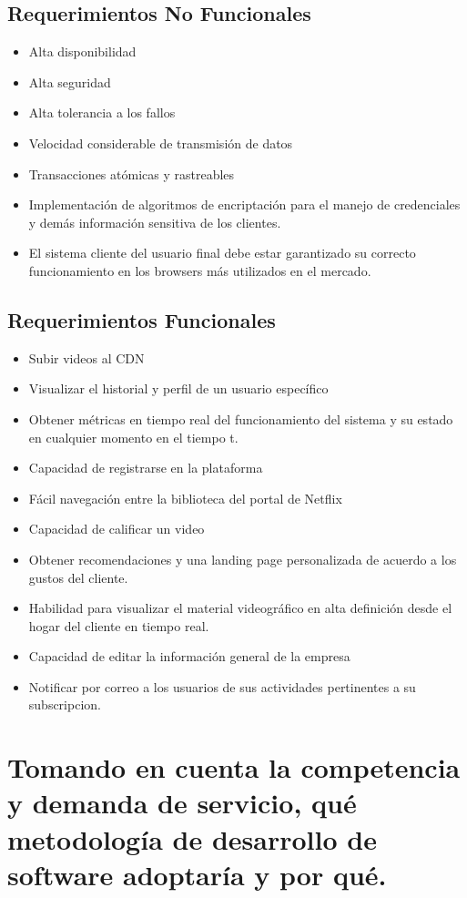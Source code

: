 \documentclass{article}
\begin{document}
\subsection{Requerimientos No Funcionales}
\begin{itemize}
	\item Alta disponibilidad
	\item Alta seguridad
	\item Alta tolerancia a los fallos
	\item Velocidad considerable de transmisión de datos
	\item Transacciones atómicas y rastreables
	\item Implementación de algoritmos de encriptación para el
		manejo de credenciales y demás información sensitiva de los
		clientes.
	\item El sistema cliente del usuario final debe estar 
		garantizado su correcto funcionamiento en los browsers más
		utilizados en el mercado.
\end{itemize}

\subsection{Requerimientos Funcionales}
\begin{itemize}
	\item Subir videos al CDN
	\item Visualizar el historial y perfil de un usuario 
		específico
	\item Obtener métricas en tiempo real del funcionamiento del
		sistema y su estado en cualquier momento en el tiempo t.
	\item Capacidad de registrarse en la plataforma
	\item Fácil navegación entre la biblioteca del portal de Netflix
	\item Capacidad de calificar un video
	\item Obtener recomendaciones y una landing page personalizada
		de acuerdo a los gustos del cliente.
	\item Habilidad para visualizar el material videográfico en alta
		definición desde el hogar del cliente en tiempo real.
	\item Capacidad de editar la información general de la empresa
	\item Notificar por correo  a los usuarios de sus 
		actividades pertinentes a su subscripcion.
\end{itemize}
\section{Tomando en cuenta la competencia y demanda de servicio,
      qué metodología de desarrollo de software adoptaría
      y por qué.}
\end{document}
